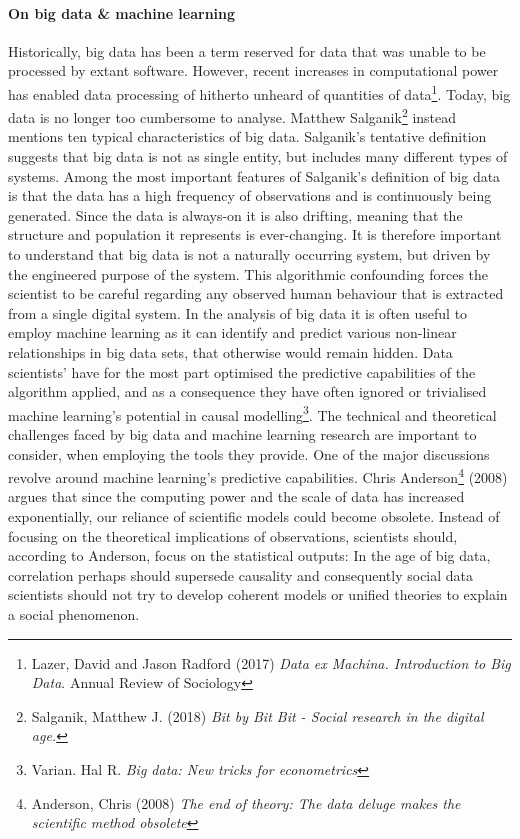 \documentclass[12pt,a4paper]{article}
\begin{document}
\paragraph{On big data \& machine learning\newline}
Historically, big data has been a term reserved for data that was unable to be processed by extant software. However, recent increases in computational power has enabled data processing of hitherto unheard of quantities of data\footnote{Lazer, David and Jason Radford (2017) \textit{Data ex Machina. Introduction to Big Data}. Annual Review of Sociology}. Today, big data is no longer too cumbersome to analyse. Matthew Salganik\footnote{Salganik, Matthew J. (2018) \textit{Bit by Bit Bit - Social research in the digital age.}} instead mentions ten typical characteristics of big data. Salganik's tentative definition suggests that big data is not as single entity, but includes many different types of systems. Among the most important features of Salganik's definition of big data is that the data has a high frequency of observations and is continuously being generated. Since the data is always-on it is also drifting, meaning that the structure and population it represents is ever-changing. It is therefore important to understand that big data is not a naturally occurring system, but driven by the engineered purpose of the system. This algorithmic confounding forces the scientist to be careful regarding any observed human behaviour that is extracted from a single digital system.\newline
In the analysis of big data it is often useful to employ machine learning as it can identify and predict various non-linear relationships in big data sets, that otherwise would remain hidden. Data scientists' have for the most part optimised the predictive capabilities of the algorithm applied, and as a consequence they have often ignored or trivialised machine learning's potential in causal modelling\footnote{Varian. Hal R. \textit{Big data: New tricks for econometrics}}.\newline
The technical and theoretical challenges faced by big data and machine learning research are important to consider, when employing the tools they provide. One of the major discussions revolve around machine learning's predictive capabilities. Chris Anderson\footnote{Anderson, Chris (2008) \textit{The end of theory: The data deluge makes the scientific method obsolete}} (2008) argues that since the computing power and the scale of data has increased exponentially, our reliance of scientific models could become obsolete. Instead of focusing on the theoretical implications of observations, scientists should, according to Anderson, focus on the statistical outputs: In the age of big data, correlation perhaps should supersede causality and consequently social data scientists should not try to develop coherent models or unified theories to explain a social phenomenon.\newline
\end{document}
